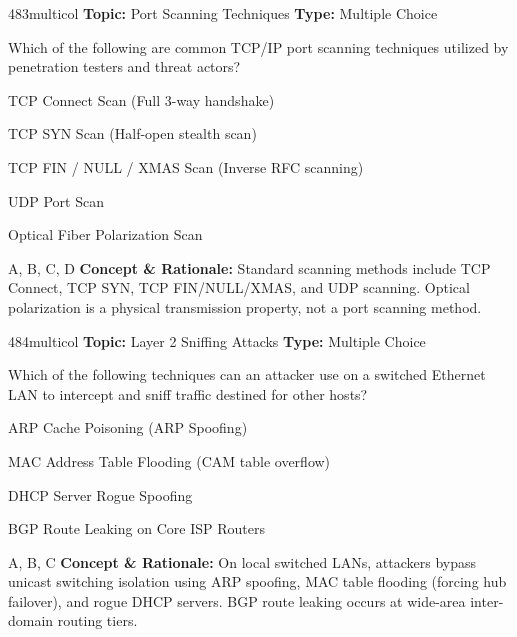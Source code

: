 \begin{qcard}{483}{multicol}
\textcolor{darkslate!75}{\small\textbf{Topic:} Port Scanning Techniques \hfill \textbf{Type:} Multiple Choice}\vspace{0.4em}\par
Which of the following are common TCP/IP port scanning techniques utilized by penetration testers and threat actors?
\begin{qoptions}
\item TCP Connect Scan (Full 3-way handshake)
\item TCP SYN Scan (Half-open stealth scan)
\item TCP FIN / NULL / XMAS Scan (Inverse RFC scanning)
\item UDP Port Scan
\item Optical Fiber Polarization Scan
\end{qoptions}
\end{qcard}
\nopagebreak
\begin{explainbox}{A, B, C, D}
\textbf{Concept \& Rationale:} Standard scanning methods include TCP Connect, TCP SYN, TCP FIN/NULL/XMAS, and UDP scanning. Optical polarization is a physical transmission property, not a port scanning method.
\end{explainbox}

\begin{qcard}{484}{multicol}
\textcolor{darkslate!75}{\small\textbf{Topic:} Layer 2 Sniffing Attacks \hfill \textbf{Type:} Multiple Choice}\vspace{0.4em}\par
Which of the following techniques can an attacker use on a switched Ethernet LAN to intercept and sniff traffic destined for other hosts?
\begin{qoptions}
\item ARP Cache Poisoning (ARP Spoofing)
\item MAC Address Table Flooding (CAM table overflow)
\item DHCP Server Rogue Spoofing
\item BGP Route Leaking on Core ISP Routers
\end{qoptions}
\end{qcard}
\nopagebreak
\begin{explainbox}{A, B, C}
\textbf{Concept \& Rationale:} On local switched LANs, attackers bypass unicast switching isolation using ARP spoofing, MAC table flooding (forcing hub failover), and rogue DHCP servers. BGP route leaking occurs at wide-area inter-domain routing tiers.
\end{explainbox}

